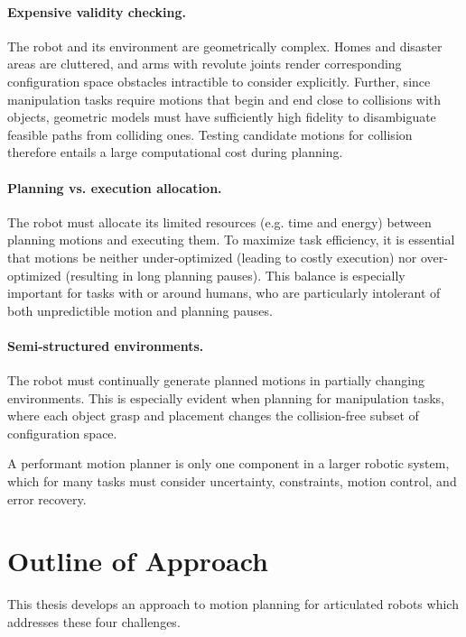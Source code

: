 \paragraph{Expensive validity checking.}
The robot and its environment are geometrically complex.
Homes and disaster areas are cluttered,
and arms with revolute joints render corresponding 
configuration space obstacles intractible to consider explicitly.
Further, since manipulation tasks require
motions that begin and end close to collisions with objects,
geometric models must have sufficiently high fidelity
to disambiguate feasible paths from colliding ones.
Testing candidate motions for collision therefore entails a
large computational cost during planning.

\paragraph{Planning vs. execution allocation.}
The robot must allocate its limited resources
(e.g. time and energy) between planning motions and executing them.
To maximize task efficiency,
it is essential that motions be neither under-optimized
(leading to costly execution)
nor over-optimized (resulting in long planning pauses).
This balance is especially important for tasks with or around
humans,
who are particularly intolerant of both unpredictible motion
and planning pauses.

\paragraph{Semi-structured environments.}
The robot must continually generate planned motions in partially
changing environments.
This is especially evident when planning for manipulation tasks,
where each object grasp and placement changes the collision-free
subset of configuration space.

A performant motion planner is only one component in a larger
robotic system,
which for many tasks must consider uncertainty, constraints,
motion control, and error recovery.

\section{Outline of Approach}

This thesis develops an approach to motion planning
for articulated robots
which addresses these four challenges.

